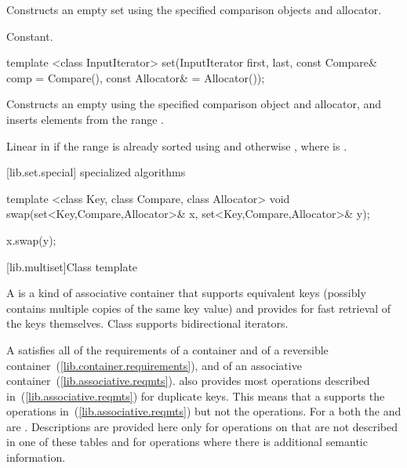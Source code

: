 \begin{itemdescr}
\pnum
\effects
Constructs an empty set using the specified comparison objects and allocator.

\pnum
\complexity
Constant.
\end{itemdescr}

%
%
\begin{itemdecl}
template <class InputIterator>
  set(InputIterator first, last,
      const Compare& comp = Compare(), const Allocator& = Allocator());
\end{itemdecl}

\begin{itemdescr}
\pnum
\effects
Constructs an empty
using the specified comparison object and allocator,
and inserts elements from the range
.

\pnum
\complexity
Linear in  if the range
is already sorted using 
and otherwise ,
where  is
.
\end{itemdescr}

[lib.set.special]{ specialized algorithms}

%
%
\begin{itemdecl}
template <class Key, class Compare, class Allocator>
  void swap(set<Key,Compare,Allocator>& x,
            set<Key,Compare,Allocator>& y);
\end{itemdecl}

\begin{itemdescr}
\pnum
\effects
\begin{codeblock}
    x.swap(y);
\end{codeblock}
\end{itemdescr}

[lib.multiset]{Class template }

\pnum
{}%
A
is a kind of associative container that supports equivalent keys (possibly contains multiple copies of
the same key value) and provides for fast retrieval of the keys themselves.
Class
supports bidirectional iterators.

\pnum
A  satisfies all of the requirements of a container and of a
reversible container~(\ref{lib.container.requirements}), and of an associative
container~(\ref{lib.associative.reqmts}).
also provides most operations described in~(\ref{lib.associative.reqmts})
for duplicate keys.
This means that a
supports the
operations in~(\ref{lib.associative.reqmts})
but not the
operations.
For a
both the
and
are
.
Descriptions are provided here only for operations on
that are not described in one of these tables
and for operations where there is additional semantic information.

